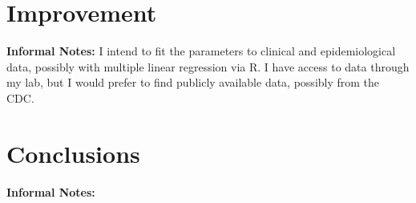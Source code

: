 \documentclass[11pt]{article}
\begin{document}
\section*{Improvement}

\textbf{Informal Notes: }I intend to fit the parameters to clinical and epidemiological data, possibly with multiple linear regression via R. I have access to data through my lab, but I would prefer to find publicly available data, possibly from the CDC.

\section*{Conclusions}

\textbf{Informal Notes: }
\clearpage 


\end{document}
